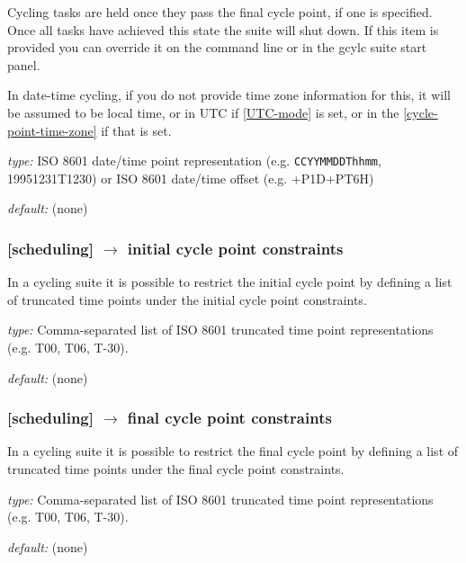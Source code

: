 Cycling tasks are held once they pass the final cycle point, if one is
specified. Once all tasks have achieved this state the suite will shut
down. If this item is provided you can override it on the command line
or in the gcylc suite start panel.

In date-time cycling, if you do not provide time zone information for this,
it will be assumed to be local time, or in UTC if \ref{UTC-mode} is set, or in
the \ref{cycle-point-time-zone} if that is set.

\begin{myitemize}
    \item {\em type:} ISO 8601 date/time point representation (e.g.
 \lstinline=CCYYMMDDThhmm=, 19951231T1230) or ISO 8601 date/time offset
    (e.g. +P1D+PT6H)
    \item {\em default:} (none)
\end{myitemize}

\subsubsection[initial cycle point constraints]{[scheduling] $\rightarrow$ initial cycle point constraints}
\label{initial cycle point constraints}

In a cycling suite it is possible to restrict the initial cycle point by
defining a list of truncated time points under the initial cycle point 
constraints.

\begin{myitemize}
    \item {\em type:} Comma-separated list of ISO 8601 truncated time point
        representations (e.g. T00, T06, T-30).
    \item {\em default:} (none)
\end{myitemize}

\subsubsection[final cycle point constraints]{[scheduling] $\rightarrow$ final cycle point constraints}
\label{final cycle point constraints}

In a cycling suite it is possible to restrict the final cycle point by
defining a list of truncated time points under the final cycle point 
constraints.

\begin{myitemize}
    \item {\em type:} Comma-separated list of ISO 8601 truncated time point
        representations (e.g. T00, T06, T-30).
    \item {\em default:} (none)
\end{myitemize}

